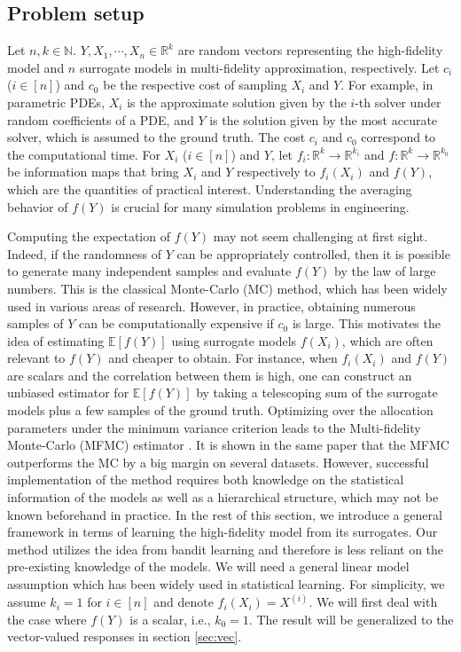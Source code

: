 \documentclass[a4paper,11pt]{article}
\numberwithin{equation}{section}
\theoremstyle{plain}
\theoremstyle{definition}
\def\R{{\mathbb R}}
\def\N{{\mathbb N}}
\def\E{{\mathbb E}}
\def\R{{\mathbb R}}
\begin{document}
\subsection{Problem setup}
Let $n, k\in\N$. 
$Y, X_1, \cdots, X_n\in\R^k$ are random vectors representing the high-fidelity model and $n$ surrogate models in multi-fidelity approximation, respectively.  
Let $c_i$ ($i\in [n]$) and $c_0$ be the respective cost of sampling $X_i$ and $Y$.  
For example, in parametric PDEs, $X_i$ is the approximate solution given by the $i$-th solver under random coefficients of a PDE, and $Y$ is the solution given by the most accurate solver, which is assumed to the ground truth. 
The cost $c_i$ and $c_0$ correspond to the computational time.   
For $X_i$ ($i\in [n]$) and $Y$, let $f_i:\R^k\to\R^{k_i}$ and $f: \R^k\to\R^{k_0}$ be information maps that bring $X_i$ and $Y$ respectively to $f_i(X_i)$ and $f(Y)$, which are the quantities of practical interest. 
Understanding the averaging behavior of $f(Y)$ is crucial for many simulation problems in engineering. 

Computing the expectation of $f(Y)$ may not seem challenging at first sight. Indeed, if the randomness of $Y$ can be appropriately controlled, then it is possible to generate many independent samples and evaluate $f(Y)$ by the law of large numbers. This is the classical Monte-Carlo (MC) method, which has been widely used in various areas of research. However, in practice, obtaining numerous samples of $Y$ can be computationally expensive if $c_0$ is large. This motivates the idea of estimating $\E[f(Y)]$ using surrogate models $f(X_i)$, which are often relevant to $f(Y)$ and cheaper to obtain. 
For instance, when $f_i(X_i)$ and $f(Y)$ are scalars and the correlation between them is high, one can construct an unbiased estimator for $\E[f(Y)]$ by taking a telescoping sum of the surrogate models plus a few samples of the ground truth. Optimizing over the allocation parameters under the minimum variance criterion leads to the Multi-fidelity Monte-Carlo (MFMC) estimator \cite{Peherstorfer_2016}.  It is shown in the same paper that the MFMC outperforms the MC by a big margin on several datasets. However, successful implementation of the method requires both knowledge on the statistical information of the models as well as a hierarchical structure, which may not be known beforehand in practice. 
In the rest of this section, we introduce a general framework in terms of learning the high-fidelity model from its surrogates. 
Our method utilizes the idea from bandit learning and therefore is less reliant on the pre-existing knowledge of the models. 
We will need a general linear model assumption which has been widely used in statistical learning.
For simplicity, we assume $k_i=1$ for $i\in [n]$ and denote $f_i(X_i) = X^{(i)}$. 
We will first deal with the case where $f(Y)$ is a scalar, i.e., $k_0=1$. 
The result will be generalized to the vector-valued responses in section \ref{sec:vec}. 
 
\end{document}
